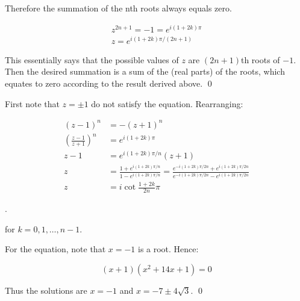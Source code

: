 \documentclass[12pt]{article}
\begin{document}
Therefore the summation of the nth roots always equals zero.


\begin{equation}
    \begin{split}
        z^{2n + 1} = -1 = e^{i(1 + 2k)\pi} \\
        z = e^{i(1 + 2k)\pi/(2n + 1)}
    \end{split}
\end{equation}

This essentially says that the possible values of $z$ are $(2n + 1)$th roots of $-1$. Then the desired summation is a sum of the (real parts) of the roots, which equates to zero according to the result derived above.
\qed



First note that $z = \pm1$ do not satisfy the equation. Rearranging:

\begin{equation}
    \begin{split}
        (z - 1)^{n} &= -(z + 1)^{n} \\
        \left( \frac{z - 1}{z + 1} \right)^{n} &= e^{i (1 + 2k)\pi} \\
        z - 1 &= e^{i (1 + 2k)\pi/n} (z + 1) \\
        z &= \frac{1 + e^{i (1 + 2k)\pi/n}}{1 - e^{i (1 + 2k)\pi/n}} = \frac{e^{-i (1 + 2k)\pi/2n} + e^{i (1 + 2k)\pi/2n}}{e^{-i (1 + 2k)\pi/2n} - e^{i (1 + 2k)\pi/2n}} \\
        z &= i \cot{\frac{1 + 2k}{2n} \pi}
    \end{split}
\end{equation}

.

\begin{correction}
    for $k = 0, 1, \dots, n - 1$.
\end{correction}

For the equation, note that $x = -1$ is a root. Hence:

\begin{equation}
    (x + 1)(x^{2} + 14x + 1) = 0
\end{equation}

Thus the solutions are $x = -1$ and $x = -7 \pm 4\sqrt{3}$.
\qed


\end{document}
